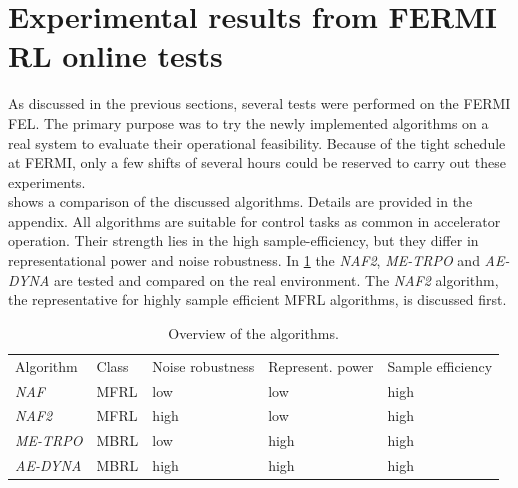 \documentclass[
reprint,nofootinbib,
amsmath,amssymb,amsfonts,clevref,
aps,
prstab,
]{revtex4-2}
\begin{document}
	\section{Experimental results from FERMI RL online tests}\label{sec:Experimental results from FERMI RL online tests}
	As discussed in the previous sections, several tests were performed on the FERMI FEL.
	The primary purpose was to try the newly implemented algorithms on a real system to evaluate their operational feasibility. 
	Because of the tight schedule at FERMI, only a few shifts of several hours could be reserved to carry out these experiments.\\ 
	 shows a comparison of the discussed algorithms. Details are provided in the appendix. All algorithms are suitable for control tasks as common in accelerator operation. Their strength lies in the high sample-efficiency, but they differ in representational power and noise robustness. In \cref{sec:Experimental results from FERMI RL online tests} the \emph{NAF2},
	\emph{ME-TRPO} and \emph{AE-DYNA} are tested and compared on the real environment. The \emph{NAF2} algorithm, the representative for highly sample efficient MFRL algorithms, is discussed first.
	\begin{table}[h!]%
		\caption{\label{tab:overview_algorithms}%
			Overview of the algorithms.
		}
		\begin{ruledtabular}
			\begin{tabular}{l p{1.5cm}p{1.5cm}p{1.5cm}p{1.5cm}}
				\textrm{Algorithm}&
				\textrm{Class}&
				\textrm{Noise \newline robustness}&
				\textrm{Represent. power}&
				\textrm{Sample \newline efficiency}\\
				\colrule
				\emph{NAF} & MFRL & low &low &high\\
				\emph{NAF2} &MFRL & high &low& high\\
				\emph{ME-TRPO} & MBRL & low& high& high\\
				\emph{AE-DYNA} & MBRL & high& high& high\\
			\end{tabular}
		\end{ruledtabular}
	\end{table}
\end{document}
